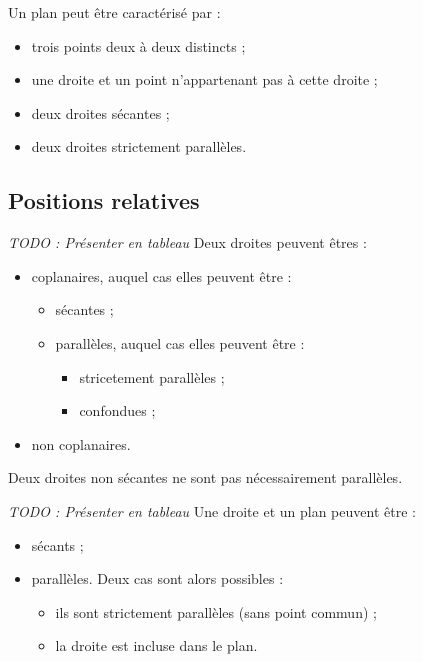 \begin{propriete}
  Un plan peut être caractérisé par :
  \begin{itemize}
    \item trois points deux à deux distincts ;
    \item une droite et un point n'appartenant pas à cette droite ;
    \item deux droites sécantes ;
    \item deux droites strictement parallèles.
  \end{itemize}
\end{propriete}

\subsection{Positions relatives}

\begin{propriete}
  \emph{TODO : Présenter en tableau}
  Deux droites peuvent êtres :
  \begin{itemize}
    \item coplanaires, auquel cas elles peuvent être :
      \begin{itemize}
        \item sécantes ;
        \item parallèles, auquel cas elles peuvent être :
          \begin{itemize}
            \item stricetement parallèles ;
            \item confondues ;
          \end{itemize}
      \end{itemize}
    \item non coplanaires.
  \end{itemize}
\end{propriete}

\begin{remarque}
  Deux droites non sécantes ne sont pas nécessairement parallèles.
\end{remarque}

\begin{propriete}
  \emph{TODO : Présenter en tableau}
  Une droite et un plan peuvent être :
  \begin{itemize}
    \item sécants ;
    \item parallèles. Deux cas sont alors possibles :
      \begin{itemize}
        \item ils sont strictement parallèles (sans point commun) ;
        \item la droite est incluse dans le plan.
      \end{itemize}
  \end{itemize}
\end{propriete}


